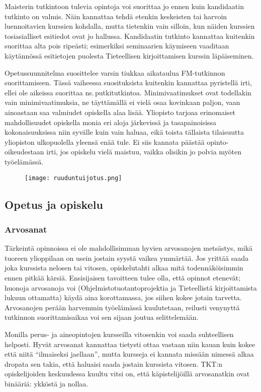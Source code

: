 \documentclass[../ala_hataile.tex]{subfiles}
\begin{document}
	Maisterin tutkintoon tulevia opintoja voi
	suorittaa jo ennen kuin kandidaatin tutkinto
	on valmis. Näin kannattaa tehdä etenkin
	keskeisten tai harvoin luennoitavien kurssien
	kohdalla, mutta tietenkin vain silloin,
	kun näiden kurssien tosiasialliset esitiedot
	ovat jo hallussa. Kandidaatin tutkinto kannattaa
	kuitenkin suorittaa alta pois ripeästi;
	esimerkiksi seminaarien käymiseen vaaditaan
	käytännössä esitietojen puolesta Tieteellisen
	kirjoittamisen kurssin läpäiseminen.
	
	Opetussuunnitelma suosittelee varsin tiukkaa
	aikataulua FM-tutkinnon suorittamiseen.
	Tässä vaiheessa suosituksista kuitenkin
	kannattaa pyristellä irti, ellei ole aikeissa
	suorittaa ns.\,putkitutkintoa. Minimivaatimukset
	ovat todellakin vain minimivaatimuksia,
	ne täyttämällä ei vielä osaa kovinkaan
	paljon, vaan ainoastaan saa valmiudet
	opiskella alaa lisää. Yliopisto tarjoaa erinomaiset
	mahdollisuudet opiskella monia
	eri aloja järkevissä ja tasapainoisissa kokonaisuuksissa
	niin syvälle kuin vain haluaa,
	eikä toista tällaista tilaisuutta yliopiston
	ulkopuolella yleensä enää tule. Ei siis kannata
	päästää opinto-oikeudestaan irti, jos
	opiskelu vielä maistuu, vaikka olisikin jo
	polvia myöten työelämässä.
	
	\begin{figure}[b]
		\centering
		\texttt{[image: ruuduntuijotus.png]}
	\end{figure}
	
	\subsection*{Opetus ja opiskelu}
	\subsubsection*{Arvosanat}
	Tärkeintä opinnoissa ei ole mahdollisimman
	hyvien arvosanojen metsästys,
	mikä tuoreen ylioppilaan on usein jostain
	syystä vaikea ymmärtää. Jos yrittää saada
	joka kurssista nelosen tai vitosen, opiskelutahti
	alkaa mitä todennäköisimmin ennen
	pitkää kärsiä. Ensisijaisen tavoitteen tulee
	olla, että opinnot etenevät; huonoja arvosanoja
	voi (Ohjelmistotuotantoprojektia ja
	Tieteellistä kirjoittamista lukuun ottamatta)
	käydä aina korottamassa, jos siihen kokee
	jotain tarvetta. Arvosanojen perään harvemmin
	työelämässä kuulutetaan, reilusti
	venynyttä tutkinnon suorittamisaikaa voi
	sen sijaan joutua selittelemään.
	
	Monilla perus- ja aineopintojen kursseilla
	vitosenkin voi saada suhteellisen
	helposti. Hyvät arvosanat kannattaa tietysti
	ottaa vastaan niin kauan kuin kokee että
	niitä ``ilmaiseksi jaellaan'', mutta kursseja ei 
	kannata missään nimessä alkaa dropata sen takia, 
	että haluaisi saada jostain kurssista vitosen. 
	TKT:n opiskelijoiden keskuudessa
	kuultu vitsi on, että käpistelijöillä arvosanatkin
	ovat binääriä: ykköstä ja nollaa.
	
\end{document}
